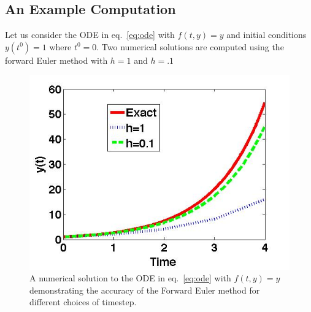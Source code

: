 \subsection{An Example Computation}
Let us consider the ODE in eq.\ \eqref{eq:ode} with $f(t,y)=y$ and initial conditions $y(t^0)=1$ where $t^0=0$. Two numerical solutions are computed using the forward Euler method with $h=1$ and $h=.1$
\begin{figure}
\begin{center}
\includegraphics[scale=0.6]{./Timestepping/Forward_Euler.jpg}
\caption{A numerical solution to the ODE in eq.\ \eqref{eq:ode} with $f(t,y)=y$ demonstrating the accuracy of the Forward Euler method for different choices of timestep.} \label{fig:FEexample}
\end{center}
\end{figure}


